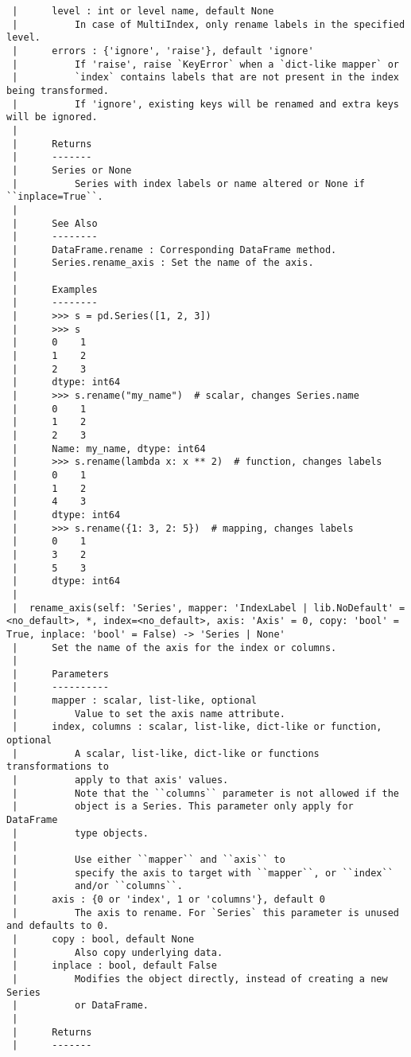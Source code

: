 \documentclass[
  letterpaper,
  DIV=11,
  numbers=noendperiod]{scrreprt}
\begin{document}
\begin{verbatim}
 |      level : int or level name, default None
 |          In case of MultiIndex, only rename labels in the specified level.
 |      errors : {'ignore', 'raise'}, default 'ignore'
 |          If 'raise', raise `KeyError` when a `dict-like mapper` or
 |          `index` contains labels that are not present in the index being transformed.
 |          If 'ignore', existing keys will be renamed and extra keys will be ignored.
 |      
 |      Returns
 |      -------
 |      Series or None
 |          Series with index labels or name altered or None if ``inplace=True``.
 |      
 |      See Also
 |      --------
 |      DataFrame.rename : Corresponding DataFrame method.
 |      Series.rename_axis : Set the name of the axis.
 |      
 |      Examples
 |      --------
 |      >>> s = pd.Series([1, 2, 3])
 |      >>> s
 |      0    1
 |      1    2
 |      2    3
 |      dtype: int64
 |      >>> s.rename("my_name")  # scalar, changes Series.name
 |      0    1
 |      1    2
 |      2    3
 |      Name: my_name, dtype: int64
 |      >>> s.rename(lambda x: x ** 2)  # function, changes labels
 |      0    1
 |      1    2
 |      4    3
 |      dtype: int64
 |      >>> s.rename({1: 3, 2: 5})  # mapping, changes labels
 |      0    1
 |      3    2
 |      5    3
 |      dtype: int64
 |  
 |  rename_axis(self: 'Series', mapper: 'IndexLabel | lib.NoDefault' = <no_default>, *, index=<no_default>, axis: 'Axis' = 0, copy: 'bool' = True, inplace: 'bool' = False) -> 'Series | None'
 |      Set the name of the axis for the index or columns.
 |      
 |      Parameters
 |      ----------
 |      mapper : scalar, list-like, optional
 |          Value to set the axis name attribute.
 |      index, columns : scalar, list-like, dict-like or function, optional
 |          A scalar, list-like, dict-like or functions transformations to
 |          apply to that axis' values.
 |          Note that the ``columns`` parameter is not allowed if the
 |          object is a Series. This parameter only apply for DataFrame
 |          type objects.
 |      
 |          Use either ``mapper`` and ``axis`` to
 |          specify the axis to target with ``mapper``, or ``index``
 |          and/or ``columns``.
 |      axis : {0 or 'index', 1 or 'columns'}, default 0
 |          The axis to rename. For `Series` this parameter is unused and defaults to 0.
 |      copy : bool, default None
 |          Also copy underlying data.
 |      inplace : bool, default False
 |          Modifies the object directly, instead of creating a new Series
 |          or DataFrame.
 |      
 |      Returns
 |      -------

\end{verbatim}
\end{document}

